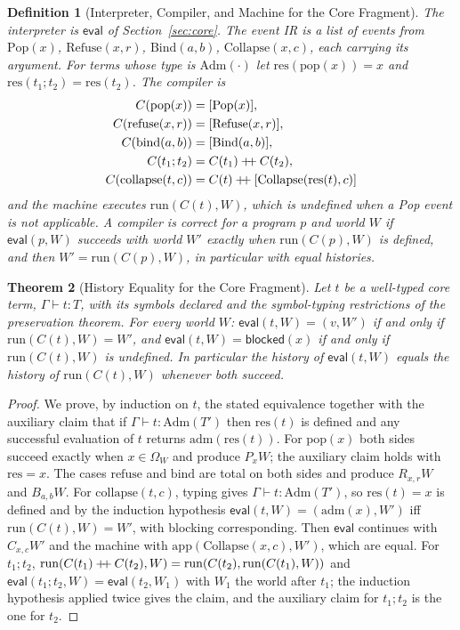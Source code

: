 \documentclass[12pt,oneside,openany]{book}
\theoremstyle{spherepop}
\newtheorem{definition}{Definition}[chapter]
\newtheorem{theorem}[definition]{Theorem}
\theoremstyle{remarkstyle}
\newcommand{\Pop}{\mathrm{Pop}}
\newcommand{\Rfuse}{\mathrm{Refuse}}
\newcommand{\Bind}{\mathrm{Bind}}
\newcommand{\Col}{\mathrm{Collapse}}
\newcommand{\hconcat}{\mathbin{+\mkern-5mu+}}
\newcommand{\Adm}[1]{\mathrm{Adm}(#1)}
\newcommand{\eval}{\mathsf{eval}}
\newcommand{\blocked}{\mathsf{blocked}}
\begin{document}
\begin{definition}[Interpreter, Compiler, and Machine for the Core Fragment]
\label{def:correctness}
The interpreter is $\eval$ of Section~\ref{sec:core}. The \emph{event IR} is a list of events from $\Pop(x)$, $\Rfuse(x,r)$, $\Bind(a,b)$, $\Col(x,c)$, each carrying its argument. For terms whose type is $\Adm{\cdot}$ let $\mathrm{res}(\mathrm{pop}(x))=x$ and $\mathrm{res}(t_1;t_2)=\mathrm{res}(t_2)$. The compiler is
\begin{align*}
C(\mathrm{pop}(x))&=[\Pop(x)],\\
C(\mathrm{refuse}(x,r))&=[\Rfuse(x,r)],\\
C(\mathrm{bind}(a,b))&=[\Bind(a,b)],\\
C(t_1;t_2)&=C(t_1)\hconcat C(t_2),\\
C(\mathrm{collapse}(t,c))&=C(t)\hconcat[\Col(\mathrm{res}(t),c)]
\end{align*}
and the machine executes $\mathrm{run}(C(t),W)$, which is undefined when a Pop event is not applicable. A compiler is \emph{correct} for a program $p$ and world $W$ if $\eval(p,W)$ succeeds with world $W'$ exactly when $\mathrm{run}(C(p),W)$ is defined, and then $W'=\mathrm{run}(C(p),W)$, in particular with equal histories.
\end{definition}

\begin{theorem}[History Equality for the Core Fragment]
\label{thm:replay}
Let $t$ be a well-typed core term, $\Gamma\vdash t:T$, with its symbols declared and the symbol-typing restrictions of the preservation theorem. For every world $W$: $\eval(t,W)=(v,W')$ if and only if $\mathrm{run}(C(t),W)=W'$, and $\eval(t,W)=\blocked(x)$ if and only if $\mathrm{run}(C(t),W)$ is undefined. In particular the history of $\eval(t,W)$ equals the history of $\mathrm{run}(C(t),W)$ whenever both succeed.
\end{theorem}

\begin{proof}
We prove, by induction on $t$, the stated equivalence together with the auxiliary claim that if $\Gamma\vdash t:\Adm{T'}$ then $\mathrm{res}(t)$ is defined and any successful evaluation of $t$ returns $\mathrm{adm}(\mathrm{res}(t))$. For $\mathrm{pop}(x)$ both sides succeed exactly when $x\in\Omega_W$ and produce $P_xW$; the auxiliary claim holds with $\mathrm{res}=x$. The cases $\mathrm{refuse}$ and $\mathrm{bind}$ are total on both sides and produce $R_{x,r}W$ and $B_{a,b}W$. For $\mathrm{collapse}(t,c)$, typing gives $\Gamma\vdash t:\Adm{T'}$, so $\mathrm{res}(t)=x$ is defined and by the induction hypothesis $\eval(t,W)=(\mathrm{adm}(x),W')$ iff $\mathrm{run}(C(t),W)=W'$, with blocking corresponding. Then $\eval$ continues with $C_{x,c}W'$ and the machine with $\mathrm{app}(\Col(x,c),W')$, which are equal. For $t_1;t_2$, $\mathrm{run}(C(t_1)\hconcat C(t_2),W)=\mathrm{run}(C(t_2),\mathrm{run}(C(t_1),W))$ and $\eval(t_1;t_2,W)=\eval(t_2,W_1)$ with $W_1$ the world after $t_1$; the induction hypothesis applied twice gives the claim, and the auxiliary claim for $t_1;t_2$ is the one for $t_2$.
\end{proof}
\end{document}
